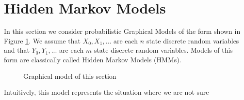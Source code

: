 \documentclass[11pt,fleqn]{article}
\theoremstyle{defstyle}
\begin{document}
\section{Hidden Markov Models}
\label{sec_hmm}
In this section we consider probabilistic Graphical Models of the form shown in Figure \ref{fig_linmod}. We assume that  $X_0, X_1,...$ are each $n$ state discrete random variables and that $Y_0, Y_1,...$ are each $m$ state discrete random variables. Models of this form are classically called Hidden Markov Models (HMMs).
\begin{figure}[H] 
\centering
{}
\caption{Graphical model of this section}
\label{fig_linmod}
\end{figure}
Intuitively, this model represents the situation where we are not sure 
\end{document}
